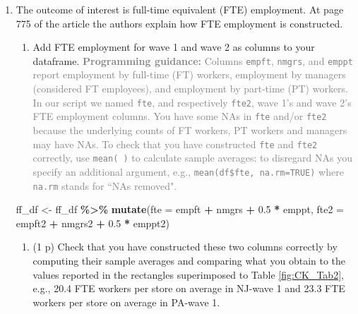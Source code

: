 \documentclass[
]{article}
\newenvironment{Shaded}{\begin{snugshade}}{\end{snugshade}}
\newcommand{\AttributeTok}[1]{\textcolor[rgb]{0.13,0.29,0.53}{#1}}
\newcommand{\FloatTok}[1]{\textcolor[rgb]{0.00,0.00,0.81}{#1}}
\newcommand{\FunctionTok}[1]{\textcolor[rgb]{0.13,0.29,0.53}{\textbf{#1}}}
\newcommand{\NormalTok}[1]{#1}
\newcommand{\OtherTok}[1]{\textcolor[rgb]{0.56,0.35,0.01}{#1}}
\newcommand{\SpecialCharTok}[1]{\textcolor[rgb]{0.81,0.36,0.00}{\textbf{#1}}}
\providecommand{\tightlist}{%
  \setlength{\itemsep}{0pt}\setlength{\parskip}{0pt}}
\begin{document}
\begin{enumerate}
\def\labelenumi{\arabic{enumi}.}
\setcounter{enumi}{11}
\item
  The outcome of interest is full-time equivalent (FTE) employment. At
  page 775 of the article the authors explain how FTE employment is
  constructed.

  \begin{enumerate}
  \def\labelenumii{\alph{enumii}.}
  \tightlist
  \item
    Add FTE employment for wave 1 and wave 2 as columns to your
    dataframe.
    \textcolor{gray}{\textbf{Programming guidance:} Columns \texttt{empft}, \texttt{nmgrs}, and \texttt{emppt} report employment by full-time (FT) workers, employment by managers (considered FT employees), and employment by part-time (PT) workers. In our script we named \texttt{fte}, and respectively \texttt{fte2}, wave 1's and wave 2's FTE employment columns. You have some NAs in \texttt{fte} and/or \texttt{fte2} because the underlying counts of FT workers, PT workers and managers may have NAs. To check that you have constructed \texttt{fte} and \texttt{fte2} correctly, use \texttt{mean( )} to calculate sample averages: to disregard NAs you specify an additional argument, e.g., \texttt{mean(df\$fte, na.rm=TRUE)} where \texttt{na.rm} stands for ``NAs removed".}
  \end{enumerate}

\begin{Shaded}
\begin{Highlighting}[]
\NormalTok{ff\_df }\OtherTok{\textless{}{-}}\NormalTok{ ff\_df }\SpecialCharTok{\%\textgreater{}\%} \FunctionTok{mutate}\NormalTok{(}\AttributeTok{fte =}\NormalTok{ empft }\SpecialCharTok{+}\NormalTok{ nmgrs }\SpecialCharTok{+} \FloatTok{0.5} \SpecialCharTok{*}\NormalTok{ emppt,}
                          \AttributeTok{fte2 =}\NormalTok{ empft2 }\SpecialCharTok{+}\NormalTok{ nmgrs2 }\SpecialCharTok{+} \FloatTok{0.5} \SpecialCharTok{*}\NormalTok{ emppt2)}
\end{Highlighting}
\end{Shaded}

  \begin{enumerate}
  \def\labelenumii{\alph{enumii}.}
  \setcounter{enumii}{1}
  \tightlist
  \item
    (1 p) Check that you have constructed these two columns correctly by
    computing their sample averages and comparing what you obtain to the
    values reported in the rectangles superimposed to Table
    \ref{fig:CK_Tab2}, e.g., 20.4 FTE workers per store on average in
    NJ-wave 1 and 23.3 FTE workers per store on average in PA-wave 1.
  \end{enumerate}


\end{enumerate}
\end{document}
